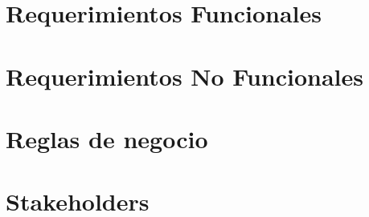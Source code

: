 \section{Requerimientos Funcionales}

\section{Requerimientos No Funcionales}

\section{Reglas de negocio}

\section{Stakeholders}
